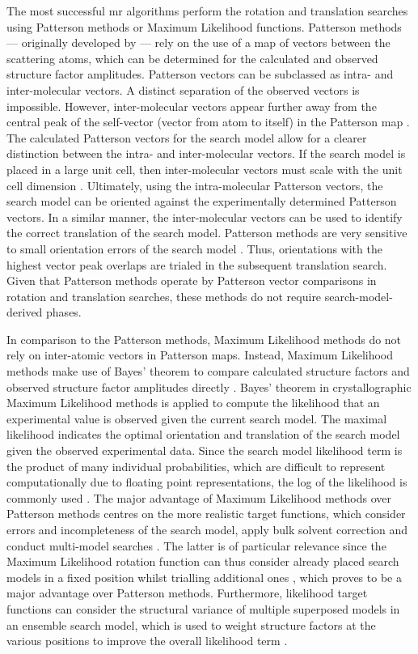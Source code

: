 The most successful \gls{mr} algorithms perform the rotation and translation searches using Patterson methods or Maximum Likelihood functions. Patterson methods --- originally developed by \textcite{Rossmann1962-ou} --- rely on the use of a map of vectors between the scattering atoms, which can be determined for the calculated and observed structure factor amplitudes. Patterson vectors can be subclassed as intra- and inter-molecular vectors. A distinct separation of the observed vectors is impossible. However, inter-molecular vectors appear further away from the central peak of the self-vector (vector from atom to itself) in the Patterson map \cite{Rupp2010-nc}. The calculated Patterson vectors for the search model allow for a clearer distinction between the intra- and inter-molecular vectors. If the search model is placed in a large unit cell, then inter-molecular vectors must scale with the unit cell dimension \cite{Rupp2010-nc}. Ultimately, using the intra-molecular Patterson vectors, the search model can be oriented against the experimentally determined Patterson vectors. In a similar manner, the inter-molecular vectors can be used to identify the correct translation of the search model. Patterson methods are very sensitive to small orientation errors of the search model \cite{Rupp2010-nc}. Thus, orientations with the highest vector peak overlaps are trialed in the subsequent translation search. Given that Patterson methods operate by Patterson vector comparisons in rotation and translation searches, these methods do not require search-model-derived phases.

In comparison to the Patterson methods, Maximum Likelihood methods do not rely on inter-atomic vectors in Patterson maps. Instead, Maximum Likelihood methods make use of Bayes' theorem \cite{Bayes1763-ox} to compare calculated structure factors and observed structure factor amplitudes directly \cite{Read2001-nu}. Bayes' theorem in crystallographic Maximum Likelihood methods is applied to compute the likelihood that an experimental value is observed given the current search model. The maximal likelihood indicates the optimal orientation and translation of the search model given the observed experimental data. Since the search model likelihood term is the product of many individual probabilities, which are difficult to represent computationally due to floating point representations, the log of the likelihood is commonly used \cite{Rupp2010-nc}. The major advantage of Maximum Likelihood methods over Patterson methods centres on the more realistic target functions, which consider errors and incompleteness of the search model, apply bulk solvent correction and conduct multi-model searches \cite{Read2001-nu}. The latter is of particular relevance since the Maximum Likelihood rotation function can thus consider already placed search models in a fixed position whilst trialling additional ones \cite{Storoni2004-ed}, which proves to be a major advantage over Patterson methods.  Furthermore, likelihood target functions can consider the structural variance of multiple superposed models in an ensemble search model, which is used to weight structure factors at the various positions to improve the overall likelihood term \cite{Read2001-nu}. 

